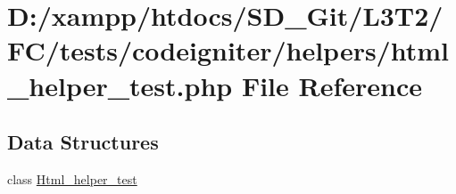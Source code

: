 \hypertarget{tests_2codeigniter_2helpers_2html__helper__test_8php}{}\section{D\+:/xampp/htdocs/\+S\+D\+\_\+\+Git/\+L3\+T2/\+F\+C/tests/codeigniter/helpers/html\+\_\+helper\+\_\+test.php File Reference}
\label{tests_2codeigniter_2helpers_2html__helper__test_8php}
\subsection*{Data Structures}
\begin{DoxyCompactItemize}
\item 
class \hyperlink{class_html__helper__test}{Html\+\_\+helper\+\_\+test}
\end{DoxyCompactItemize}
